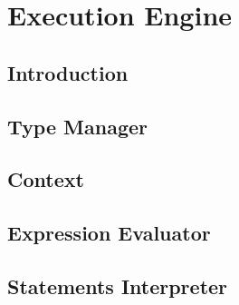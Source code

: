 \chapter{\label{engine}Execution Engine}
\section{\label{engine:intro}Introduction}
\section{\label{engine:type}Type Manager}
\section{\label{engine:context}Context}
\section{\label{engine:expression}Expression Evaluator}
\section{\label{engine:statement}Statements Interpreter}
